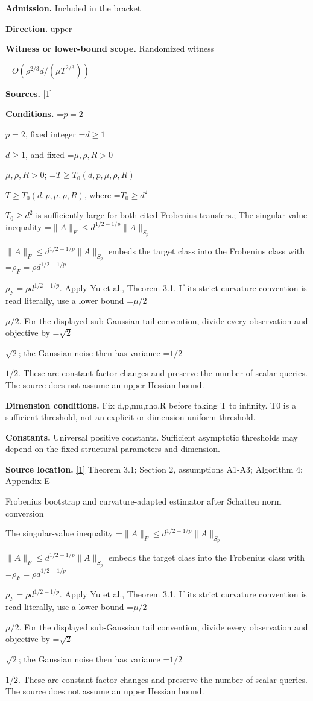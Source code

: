 \documentclass[10pt,a4paper]{article}
\newcommand{\AtlasMath}[1]{\par\begingroup\centering\setbox0=\hbox{$\displaystyle #1$}\ifdim\wd0>1.4\linewidth\typeout{ATLAS WIDE FORMULA: \the\wd0}\fi\ifdim\wd0>\linewidth\resizebox{\linewidth}{!}{\box0}\else\box0\fi\par\endgroup}
\newcommand{\AtlasInlineMath}[1]{\begingroup\setbox0=\hbox{$#1$}\ifdim\wd0>.4\linewidth\endgroup\AtlasMath{#1}\else\endgroup$#1$\fi}
\begin{document}
\textbf{Admission.} Included in the bracket



\textbf{Direction.} upper



\textbf{Witness or lower-bound scope.} Randomized witness



\AtlasMath{O(\rho^{2/3}d/(\mu T^{2/3}))}


\textbf{Sources.} \href{https://papers.nips.cc/paper_files/paper/2024/file/b444ad72520a5f5c467343be88e352ed-Paper-Conference.pdf}{[1]}



\textbf{Conditions.} \AtlasInlineMath{p=2}, fixed integer \AtlasInlineMath{d\ge1}, and fixed \AtlasInlineMath{\mu,\rho,R>0}; \AtlasInlineMath{T\ge T_0(d,p,\mu,\rho,R)}, where \AtlasInlineMath{T_0\ge d^2} is sufficiently large for both cited Frobenius transfers.; The singular-value inequality \AtlasInlineMath{\|A\|_F\le d^{1/2-1/p}\|A\|_{S_p}} embeds the target class into the Frobenius class with \AtlasInlineMath{\rho_F=\rho d^{1/2-1/p}}. Apply Yu et al., Theorem 3.1. If its strict curvature convention is read literally, use a lower bound \AtlasInlineMath{\mu/2}. For the displayed sub-Gaussian tail convention, divide every observation and objective by \AtlasInlineMath{\sqrt2}; the Gaussian noise then has variance \AtlasInlineMath{1/2}. These are constant-factor changes and preserve the number of scalar queries. The source does not assume an upper Hessian bound.



\textbf{Dimension conditions.} Fix d,p,mu,rho,R before taking T to infinity. T0 is a sufficient threshold, not an explicit or dimension-uniform threshold.



\textbf{Constants.} Universal positive constants. Sufficient asymptotic thresholds may depend on the fixed structural parameters and dimension.



\textbf{Source location.} \href{https://papers.nips.cc/paper_files/paper/2024/file/b444ad72520a5f5c467343be88e352ed-Paper-Conference.pdf}{[1]} Theorem 3.1; Section 2, assumptions A1-A3; Algorithm 4; Appendix E



Frobenius bootstrap and curvature-adapted estimator after Schatten norm conversion



The singular-value inequality \AtlasInlineMath{\|A\|_F\le d^{1/2-1/p}\|A\|_{S_p}} embeds the target class into the Frobenius class with \AtlasInlineMath{\rho_F=\rho d^{1/2-1/p}}. Apply Yu et al., Theorem 3.1. If its strict curvature convention is read literally, use a lower bound \AtlasInlineMath{\mu/2}. For the displayed sub-Gaussian tail convention, divide every observation and objective by \AtlasInlineMath{\sqrt2}; the Gaussian noise then has variance \AtlasInlineMath{1/2}. These are constant-factor changes and preserve the number of scalar queries. The source does not assume an upper Hessian bound.
\end{document}
